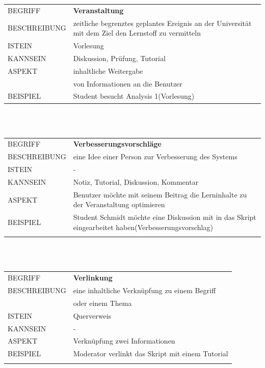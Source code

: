 \documentclass[12pt,a4paper]{article}
\begin{document}
\begin{tabular}{l p{12cm}}
BEGRIFF 	 & \textbf{Veranstaltung} \\ 
BESCHREIBUNG & zeitliche begrenztes geplantes Ereignis an der Universität mit 				   dem Ziel den Lernstoff zu vermitteln\\ 
ISTEIN   	 & Vorlesung\\
KANNSEIN 	 & Diskussion, Prüfung, Tutorial\\ 
ASPEKT   	 & inhaltliche Weitergabe\\
			 & von Informationen an die Benutzer\\
BEISPIEL 	 & Student besucht Analysis 1(Vorlesung)\\
\hline
\end{tabular}\\\\  

\begin{tabular}{l p{12cm}}
BEGRIFF 	 & \textbf{Verbesserungsvorschläge} \\ 
BESCHREIBUNG & eine Idee einer Person zur Verbesserung des Systems\\ 
ISTEIN   	 & - \\
KANNSEIN 	 & Notiz, Tutorial, Diskussion, Kommentar\\ 
ASPEKT   	 & Benutzer möchte mit seinem Beitrag die Lerninhalte zu der 					   Veranstaltung optimieren\\
BEISPIEL 	 & Student Schmidt möchte eine Diskussion mit in das Skript 					   eingearbeitet haben(Verbesserungsvorschlag)\\\\
\hline
\end{tabular}\\\\

\begin{tabular}{l p{12cm}} 
BEGRIFF 	 & \textbf{Verlinkung} \\ 
BESCHREIBUNG & eine inhaltliche Verknüpfung zu einem Begriff\\
			 & oder einem Thema\\ 
ISTEIN   	 & Querverweis\\
KANNSEIN 	 & -\\ 
ASPEKT   	 & Verknüpfung zwei Informationen\\
BEISPIEL 	 & Moderator verlinkt das Skript mit einem Tutorial\\\\
\hline
\end{tabular}\\\\ 
\end{document}
